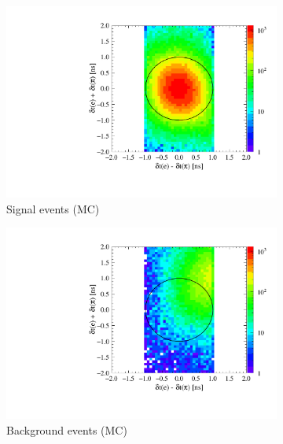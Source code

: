 \begin{figure}[h!]
  \captionsetup[subfigure]{justification=centering}
  \centering
  \begin{subfigure}{0.45\textwidth}
    \includegraphics[width=1.0\textwidth]{Chapter7_analysis_kloe/img/t2/t2_tof2_signal}
    \caption{Signal events (MC)}
  \end{subfigure}
  \begin{subfigure}{0.45\textwidth}
    \includegraphics[width=1.0\textwidth]{Chapter7_analysis_kloe/img/t2/t2_tof2_background}
    \caption{Background events (MC)}
  \end{subfigure}
  \begin{subfigure}{0.45\textwidth}

\end{subfigure}
\end{figure}
